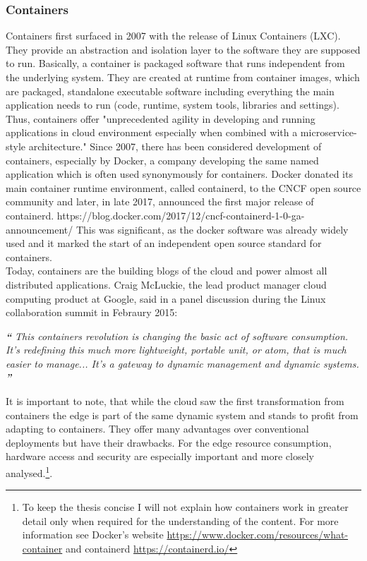 \subsubsection{Containers} \label{sec:containers}
Containers first surfaced in 2007 with the release of Linux Containers (LXC). They provide an abstraction and isolation layer to the software they are supposed to run. Basically, a container is packaged software that runs independent from the underlying system. They are created at runtime from container images, which are packaged, standalone executable software including everything the main application needs to run (code, runtime, system tools, libraries and settings)\cite{containerDefinition:online}. Thus, containers offer
"unprecedented agility in developing and running applications in cloud environment especially when combined with a microservice-style architecture."\cite{microserviceContainers} Since 2007, there has been considered development of containers, especially by Docker, a company developing the same named application which is often used synonymously for containers. Docker donated its main container runtime environment, called containerd, to the CNCF open source community and later, in late 2017, announced the first major release of containerd. https://blog.docker.com/2017/12/cncf-containerd-1-0-ga-announcement/ This was significant, as the docker software was already widely used and it marked the start of an independent open source standard for containers.\\
Today, containers are the building blogs of the cloud and power almost all distributed applications. Craig McLuckie, the lead product manager cloud computing product at Google, said in a panel discussion during the Linux collaboration summit in Febraury 2015:
\begin{displayquote}
\textit{\textbf{\large{``}}}
\textit{This containers revolution is changing the basic act of software consumption. It’s redefining this much more lightweight, portable unit, or atom, that is much easier to manage... It’s a gateway to dynamic management and dynamic systems.}
\textit{\textbf{\large{''}}}
\end{displayquote}
It is important to note, that while the cloud saw the first transformation from containers the edge is part of the same dynamic system and stands to profit from adapting to containers. They offer many advantages over conventional deployments but have their drawbacks. For the edge resource consumption, hardware access and security are especially important and more closely analysed.\footnote{To keep the thesis concise I will not explain how containers work in greater detail only when required for the understanding of the content. For more information see Docker's website  \url{https://www.docker.com/resources/what-container} and containerd \url{https://containerd.io/}}.\\[0.5mm]

